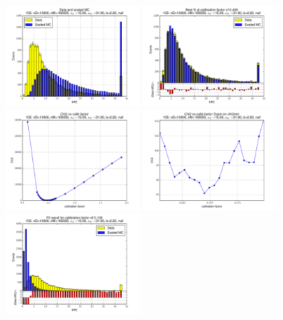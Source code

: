 
 \begin{figure}[htbp] \begin{center} 
\includegraphics[width=0.45\textwidth]{../FIGURES/105/FIG_Data_and_scaled_MC.pdf} 
\includegraphics[width=0.45\textwidth]{../FIGURES/105/FIG_Best_fit_at_calibration_factor_of_0_469.pdf} 
\includegraphics[width=0.45\textwidth]{../FIGURES/105/FIG_Chi2_vs_calib_factor.pdf} 
\includegraphics[width=0.45\textwidth]{../FIGURES/105/FIG_Chi2_vs_calib_factor_Zoom_on_chi2min.pdf} 
\includegraphics[width=0.45\textwidth]{../FIGURES/105/FIG_Fit_result_for_calibration_factor_of_0_100.pdf} 

\end{center}
\end{figure}
